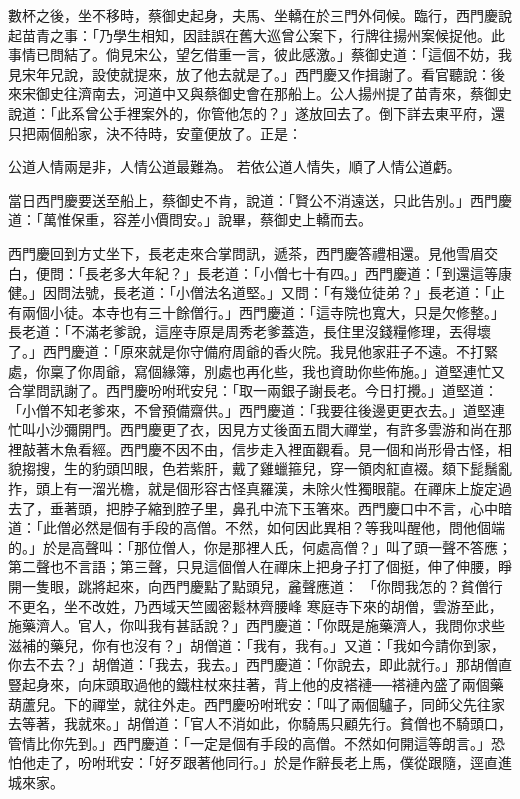 \begin{showcontents}{}
數杯之後，坐不移時，蔡御史起身，夫馬、坐轎在於三門外伺候。臨行，西門慶說起苗青之事：「乃學生相知，因詿誤在舊大巡曾公案下，行牌往揚州案候捉他。此事情已問結了。倘見宋公，望乞借重一言，彼此感激。」蔡御史道：「這個不妨，我見宋年兄說，設使就提來，放了他去就是了。」西門慶又作揖謝了。看官聽說：後來宋御史往濟南去，河道中又與蔡御史會在那船上。公人揚州提了苗青來，蔡御史說道：「此系曾公手裡案外的，你管他怎的？」遂放回去了。倒下詳去東平府，還只把兩個船家，決不待時，安童便放了。正是：

公道人情兩是非，人情公道最難為。
若依公道人情失，順了人情公道虧。

當日西門慶要送至船上，蔡御史不肯，說道：「賢公不消遠送，只此告別。」西門慶道：「萬惟保重，容差小價問安。」說畢，蔡御史上轎而去。

西門慶回到方丈坐下，長老走來合掌問訊，遞茶，西門慶答禮相還。見他雪眉交白，便問：「長老多大年紀？」長老道：「小僧七十有四。」西門慶道：「到還這等康健。」因問法號，長老道：「小僧法名道堅。」又問：「有幾位徒弟？」長老道：「止有兩個小徒。本寺也有三十餘僧行。」西門慶道：「這寺院也寬大，只是欠修整。」長老道：「不滿老爹說，這座寺原是周秀老爹蓋造，長住里沒錢糧修理，丟得壞了。」西門慶道：「原來就是你守備府周爺的香火院。我見他家莊子不遠。不打緊處，你稟了你周爺，寫個緣簿，別處也再化些，我也資助你些佈施。」道堅連忙又合掌問訊謝了。西門慶吩咐玳安兒：「取一兩銀子謝長老。今日打攪。」道堅道：「小僧不知老爹來，不曾預備齋供。」西門慶道：「我要往後邊更更衣去。」道堅連忙叫小沙彌開門。西門慶更了衣，因見方丈後面五間大禪堂，有許多雲游和尚在那裡敲著木魚看經。西門慶不因不由，信步走入裡面觀看。見一個和尚形骨古怪，相貌搊搜，生的豹頭凹眼，色若紫肝，戴了雞蠟箍兒，穿一領肉紅直裰。頦下髭鬚亂拃，頭上有一溜光檐，就是個形容古怪真羅漢，未除火性獨眼龍。在禪床上旋定過去了，垂著頭，把脖子縮到腔子里，鼻孔中流下玉箸來。西門慶口中不言，心中暗道：「此僧必然是個有手段的高僧。不然，如何因此異相？等我叫醒他，問他個端的。」於是高聲叫：「那位僧人，你是那裡人氏，何處高僧？」叫了頭一聲不答應；第二聲也不言語；第三聲，只見這個僧人在禪床上把身子打了個挺，伸了伸腰，睜開一隻眼，跳將起來，向西門慶點了點頭兒，麄聲應道： 「你問我怎的？貧僧行不更名，坐不改姓，乃西域天竺國密鬆林齊腰峰 寒庭寺下來的胡僧，雲游至此，施藥濟人。官人，你叫我有甚話說？」西門慶道：「你既是施藥濟人，我問你求些滋補的藥兒，你有也沒有？」胡僧道：「我有，我有。」又道：「我如今請你到家，你去不去？」胡僧道：「我去，我去。」西門慶道：「你說去，即此就行。」那胡僧直豎起身來，向床頭取過他的鐵柱杖來拄著，背上他的皮褡褳──褡褳內盛了兩個藥葫蘆兒。下的禪堂，就往外走。西門慶吩咐玳安：「叫了兩個驢子，同師父先往家去等著，我就來。」胡僧道：「官人不消如此，你騎馬只顧先行。貧僧也不騎頭口，管情比你先到。」西門慶道：「一定是個有手段的高僧。不然如何開這等朗言。」恐怕他走了，吩咐玳安：「好歹跟著他同行。」於是作辭長老上馬，僕從跟隨，逕直進城來家。


\end{showcontents}
